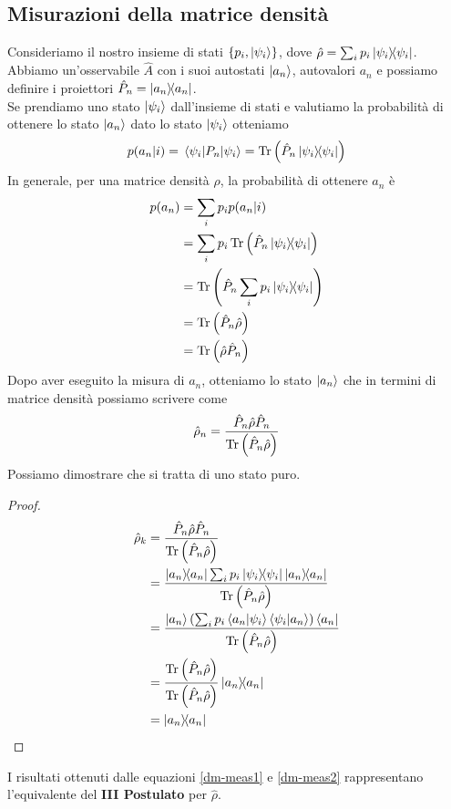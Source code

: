 \subsection{Misurazioni della matrice densità}
Consideriamo il nostro insieme di stati $\{p_i, \ket{\psi_i}\}$, dove $\hat \rho = \sum_i p_i \op{\psi_i}{\psi_i}$. Abbiamo un'osservabile $\hat A$ con i suoi autostati $\ket{a_n}$, autovalori $a_n$ e possiamo definire i proiettori $\hat P_n = \op{a_n}{a_n}$.\\
Se prendiamo uno stato $\ket{\psi_i}$ dall'insieme di stati e valutiamo la probabilità di ottenere lo stato $\ket{a_n}$ dato lo stato $\ket{\psi_i}$ otteniamo
\begin{equation*}
    p(a_n|i)=\mel{\psi_i}{P_n}{\psi_i}=\Tr\left(\hat P_n \op{\psi_i}{\psi_i}\right)
\end{equation*}
In generale, per una matrice densità $\rho$, la probabilità di ottenere $a_n$ è
\begin{equation}\label{dm-meas1}
    \begin{aligned}
        p(a_n) &= \sum_i p_i p(a_n|i) \\
               &= \sum_i p_i \Tr\left(\hat P_n \op{\psi_i}{\psi_i}\right) \\
               &= \Tr \left(\hat P_n \sum_i p_i \op{\psi_i}{\psi_i}\right) \\
               &= \Tr \left(\hat P_n \hat \rho\right) \\
               &= \Tr \left(\hat \rho \hat P_n \right)
    \end{aligned}
\end{equation}
Dopo aver eseguito la misura di $a_n$, otteniamo lo stato $\ket{a_n}$ che in termini di matrice densità possiamo scrivere come
\begin{equation}\label{dm-meas2}
    \hat \rho_n = \frac{\hat P_n \hat \rho \hat P_n}{\Tr \left(\hat P_n \hat \rho \right)}
\end{equation}
Possiamo dimostrare che si tratta di uno stato puro.
\begin{proof}
    \begin{equation*}
        \begin{aligned}
            \hat \rho_k &= \frac{\hat P_n \hat \rho \hat P_n}{\Tr \left(\hat P_n \hat \rho \right)} \\
                        &= \frac{\op{a_n}{a_n}\sum_i p_i \op{\psi_i}{\psi_i} \op{a_n}{a_n}}{\Tr \left(\hat P_n \hat \rho\right)} \\
                        &= \frac{\ket{a_n}\left(\sum_i p_i \ip{a_n}{\psi_i}\ip{\psi_i}{a_n}\right)\bra{a_n}}{\Tr \left(\hat P_n \hat \rho\right)} \\
                        &= \frac{\Tr \left(\hat P_n \hat \rho\right)}{\Tr \left(\hat P_n \hat \rho\right)}\op{a_n}{a_n} \\
                        &= \op{a_n}{a_n}
        \end{aligned}
    \end{equation*}
\end{proof}
\noindent I risultati ottenuti dalle equazioni \eqref{dm-meas1} e \eqref{dm-meas2} rappresentano l'equivalente del \textbf{III Postulato} per $\hat \rho$. 